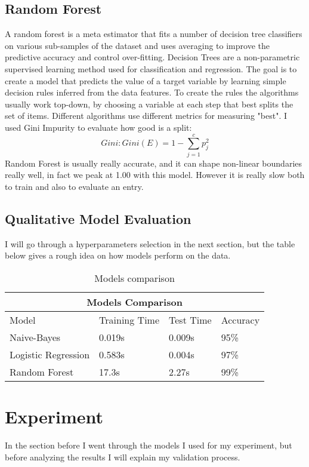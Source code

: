 \documentclass[12pt]{article}
\begin{document}
\subsection{Random Forest}
A random forest is a meta estimator that fits a number of decision tree classifiers on various sub-samples of the dataset and uses averaging to improve the predictive accuracy and control over-fitting.
Decision Trees are a non-parametric supervised learning method used for classification and regression. The goal is to create a model that predicts the value of a target variable by learning simple decision rules inferred from the data features.
To create the rules the algorithms  usually work top-down, by choosing a variable at each step that best splits the set of items. Different algorithms use different metrics for measuring "best".
I used Gini Impurity to evaluate how good is a split:
$$ \textit{Gini}: \mathit{Gini}(E) = 1 - \sum_{j=1}^{c}p_j^2 $$
Random Forest is usually really accurate, and it can shape non-linear boundaries really well, in fact we peak at 1.00 with this model. However it is really slow both to train and also to evaluate an entry.
\subsection{Qualitative Model Evaluation}
I will go through a hyperparameters selection in the next section, but the table below gives a rough idea on how models perform on the data.
\begin{table}[h]
\begin{center}
\begin{adjustwidth}{-0.5cm}{}
\centering
\begin{tabular}{ |p{4cm}||p{4cm}|p{4cm}|p{4cm}||}
 \hline
 \multicolumn{4}{|c|}{Models Comparison} \\
 \hline
 Model    & Training Time &Test Time &Accuracy\\
 \hline
 Naive-Bayes   & 0.019s   &0.009s &95\%\\
 Logistic Regression   &0.583s & 0.004s &97\%  \\
 Random Forest   & 17.3s & 2.27s & 99\% \\
 \hline
\end{tabular}
\caption{Models comparison}
\end{adjustwidth}
\end{center}
\end{table}
\section{Experiment}
In the section before I went through the models I used for my experiment, but before analyzing the results I will explain my validation process.
\end{document}
